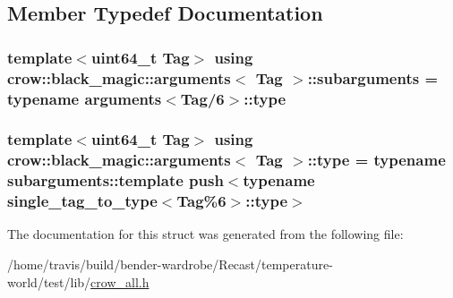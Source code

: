 \subsection{Member Typedef Documentation}
\hypertarget{structcrow_1_1black__magic_1_1arguments_a3f85c27b3f73489df979871463b062f6}{
\subsubsection[{subarguments}]{\setlength{\rightskip}{0pt plus 5cm}template$<$uint64\-\_\-t Tag$>$ using {\bf crow\-::black\-\_\-magic\-::arguments}$<$ Tag $>$\-::{\bf subarguments} =  typename {\bf arguments}$<$Tag/6$>$\-::{\bf type}}}\label{structcrow_1_1black__magic_1_1arguments_a3f85c27b3f73489df979871463b062f6}
\hypertarget{structcrow_1_1black__magic_1_1arguments_a6aa2de44853bc54fdf1b8e8756e2612c}{
\subsubsection[{type}]{\setlength{\rightskip}{0pt plus 5cm}template$<$uint64\-\_\-t Tag$>$ using {\bf crow\-::black\-\_\-magic\-::arguments}$<$ Tag $>$\-::{\bf type} =  typename subarguments\-::template push$<$typename {\bf single\-\_\-tag\-\_\-to\-\_\-type}$<$Tag\%6$>$\-::{\bf type}$>$}}\label{structcrow_1_1black__magic_1_1arguments_a6aa2de44853bc54fdf1b8e8756e2612c}


The documentation for this struct was generated from the following file\-:\begin{DoxyCompactItemize}
\item 
/home/travis/build/bender-\/wardrobe/\-Recast/temperature-\/world/test/lib/\hyperlink{crow__all_8h}{crow\-\_\-all.\-h}\end{DoxyCompactItemize}
